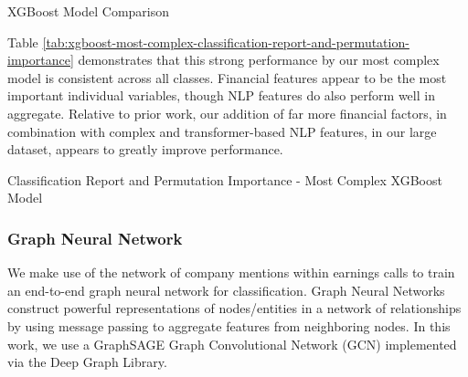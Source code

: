 \documentclass{article}[11pt]
\begin{document}
    \begin{table}[h!]
        \centering
        \caption{XGBoost Model Comparison}
        
        \label{tab:xgboost-model-comparison}
    \end{table}

    Table \ref{tab:xgboost-most-complex-classification-report-and-permutation-importance} demonstrates that this strong performance by our most complex model is consistent across all classes. Financial features appear to be the most important individual variables, though NLP features do also perform well in aggregate. Relative to prior work, our addition of far more financial factors, in combination with complex and transformer-based NLP features, in our large dataset, appears to greatly improve performance.


    \begin{table}[h!]
        \centering
        \caption{Classification Report and Permutation Importance - Most Complex XGBoost Model}
        \begin{minipage}[c]{0.45\linewidth}
            \centering
            
        \end{minipage}
        \begin{minipage}[c]{0.45\linewidth}
            \centering
            
        \end{minipage}
        \label{tab:xgboost-most-complex-classification-report-and-permutation-importance}
    \end{table}

    \subsubsection*{Graph Neural Network}

    We make use of the network of company mentions within earnings calls to train an end-to-end graph neural network for classification. Graph Neural Networks construct powerful representations of nodes/entities in a network of relationships by using message passing to aggregate features from neighboring nodes. In this work, we use a GraphSAGE \citep{hamilton_inductive_2018} Graph Convolutional Network (GCN) implemented via the Deep Graph Library. \citep{deep_graph_library_deep_2024}
\end{document}
